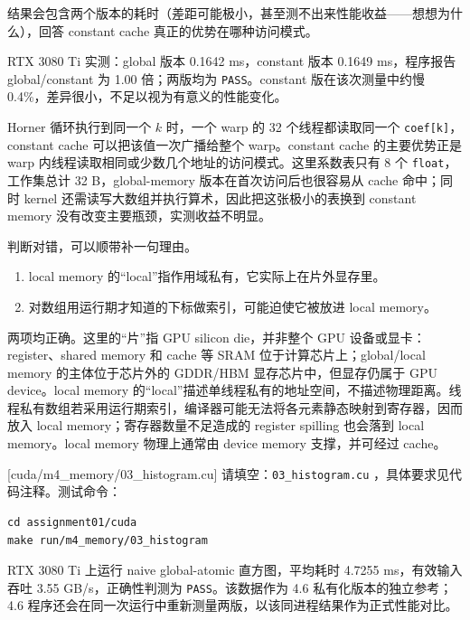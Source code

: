\documentclass[11pt,a4paper,fontset=none]{ctexart}
\begin{document}
结果会包含两个版本的耗时（差距可能极小，甚至测不出来性能收益——想想为什么），回答 constant cache 真正的优势在哪种访问模式。

\begin{tcolorbox}[title={4.3 实验记录与性能分析}]
RTX 3080 Ti 实测：global 版本 0.1642 ms，constant 版本 0.1649 ms，程序报告 global/constant 为 1.00 倍；两版均为 \texttt{PASS}。constant 版在该次测量中约慢 0.4\%，差异很小，不足以视为有意义的性能变化。

Horner 循环执行到同一个 $k$ 时，一个 warp 的 32 个线程都读取同一个 \texttt{coef[k]}，constant cache 可以把该值一次广播给整个 warp。constant cache 的主要优势正是 warp 内线程读取相同或少数几个地址的访问模式。这里系数表只有 8 个 \texttt{float}，工作集总计 32 B，global-memory 版本在首次访问后也很容易从 cache 命中；同时 kernel 还需读写大数组并执行算术，因此把这张极小的表换到 constant memory 没有改变主要瓶颈，实测收益不明显。
\end{tcolorbox}

判断对错，可以顺带补一句理由。
\begin{enumerate}[label=(\alph*)]
  \item local memory 的“local”指作用域私有，它实际上在片外显存里。
  \item 对数组用运行期才知道的下标做索引，可能迫使它被放进 local memory。
\end{enumerate}

\begin{tcolorbox}[title={4.4 作答（讨论后整理）}]
两项均正确。这里的“片”指 GPU silicon die，并非整个 GPU 设备或显卡：register、shared memory 和 cache 等 SRAM 位于计算芯片上；global/local memory 的主体位于芯片外的 GDDR/HBM 显存芯片中，但显存仍属于 GPU device。local memory 的“local”描述单线程私有的地址空间，不描述物理距离。线程私有数组若采用运行期索引，编译器可能无法将各元素静态映射到寄存器，因而放入 local memory；寄存器数量不足造成的 register spilling 也会落到 local memory。local memory 物理上通常由 device memory 支撑，并可经过 cache。
\end{tcolorbox}

[cuda/m4\_memory/03\_histogram.cu]
请填空：\texttt{03\_histogram.cu} ，具体要求见代码注释。测试命令：

\begin{lstlisting}
cd assignment01/cuda
make run/m4_memory/03_histogram
\end{lstlisting}

\begin{tcolorbox}[title={4.5 判测与基准记录}]
RTX 3080 Ti 上运行 naive global-atomic 直方图，平均耗时 4.7255 ms，有效输入吞吐 3.55 GB/s，正确性判测为 \texttt{PASS}。该数据作为 4.6 私有化版本的独立参考；4.6 程序还会在同一次运行中重新测量两版，以该同进程结果作为正式性能对比。
\end{tcolorbox}
\end{document}

